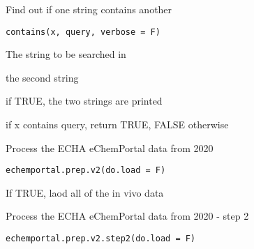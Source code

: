 \documentclass[letterpaper]{book}
\begin{document}
%
\begin{Description}\relax
Find out if one string contains another
\end{Description}
%
\begin{Usage}
\begin{verbatim}
contains(x, query, verbose = F)
\end{verbatim}
\end{Usage}
%
\begin{Arguments}
\begin{ldescription}
\item[\code{x}] The string to be searched in

\item[\code{query}] the second string

\item[\code{verbose}] if TRUE, the two strings are printed
\end{ldescription}
\end{Arguments}
%
\begin{Value}
if x contains query, return TRUE, FALSE otherwise
\end{Value}
%
\begin{Description}\relax
Process the ECHA eChemPortal data from 2020
\end{Description}
%
\begin{Usage}
\begin{verbatim}
echemportal.prep.v2(do.load = F)
\end{verbatim}
\end{Usage}
%
\begin{Arguments}
\begin{ldescription}
\item[\code{do.load}] If TRUE, laod all of the in vivo data
\end{ldescription}
\end{Arguments}
%
\begin{Description}\relax
Process the ECHA eChemPortal data from 2020 - step 2
\end{Description}
%
\begin{Usage}
\begin{verbatim}
echemportal.prep.v2.step2(do.load = F)
\end{verbatim}
\end{Usage}
\end{document}

